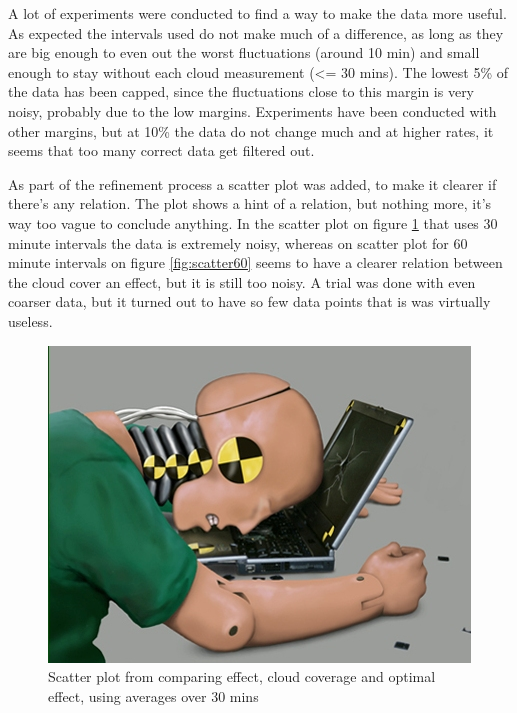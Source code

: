 A lot of experiments were conducted to find a way to make the data
more useful.  As expected the intervals used do not make much of a
difference, as long as they are big enough to even out the worst
fluctuations (around 10 min) and small enough to stay without each
cloud measurement (<= 30 mins).  The lowest 5\% of the data has been
capped, since the fluctuations close to this margin is very noisy,
probably due to the low margins. Experiments have been conducted with
other margins, but at 10\% the data do not change much and at higher
rates, it seems that too many correct data get filtered out.

As part of the refinement process a scatter plot was added, to make it
clearer if there's any relation.  The plot shows a hint of a relation,
but nothing more, it's way too vague to conclude anything.  In the
scatter plot on figure \ref{fig:scatter30} that uses 30 minute
intervals the data is extremely noisy, whereas on scatter plot for 60
minute intervals on figure \ref{fig:scatter60} seems to have a clearer
relation between the cloud cover an effect, but it is still too noisy.
A trial was done with even coarser data, but it turned out to have so
few data points that is was virtually useless.

\begin{figure}
  \centering
  \includegraphics{dummy.jpg}
  \caption{Scatter plot from comparing effect, cloud coverage and
    optimal effect, using averages over 30 mins}
  \label{fig:scatter30}
\end{figure}

